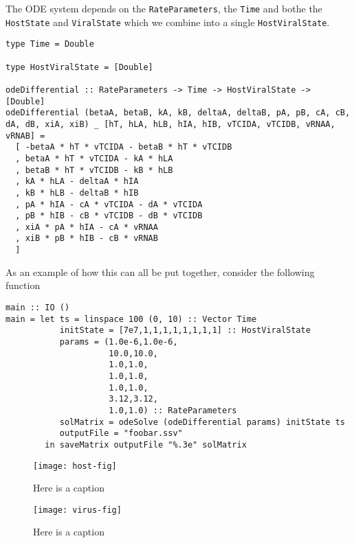 \documentclass{article}
\begin{document}
The ODE system depends on the \lstinline|RateParameters|, the \lstinline|Time|
and bothe the \lstinline|HostState| and \lstinline|ViralState| which we combine
into a single \lstinline|HostViralState|.

\begin{lstlisting}[caption={Give me a real caption}, label=differentialDefn]
type Time = Double

type HostViralState = [Double]

odeDifferential :: RateParameters -> Time -> HostViralState -> [Double]
odeDifferential (betaA, betaB, kA, kB, deltaA, deltaB, pA, pB, cA, cB, dA, dB, xiA, xiB) _ [hT, hLA, hLB, hIA, hIB, vTCIDA, vTCIDB, vRNAA, vRNAB] =
  [ -betaA * hT * vTCIDA - betaB * hT * vTCIDB
  , betaA * hT * vTCIDA - kA * hLA
  , betaB * hT * vTCIDB - kB * hLB
  , kA * hLA - deltaA * hIA
  , kB * hLB - deltaB * hIB
  , pA * hIA - cA * vTCIDA - dA * vTCIDA
  , pB * hIB - cB * vTCIDB - dB * vTCIDB
  , xiA * pA * hIA - cA * vRNAA
  , xiB * pB * hIB - cB * vRNAB
  ]
\end{lstlisting}

As an example of how this can all be put together, consider the following function

\begin{lstlisting}[caption={Give me a real caption}, label=mainFunc1]
main :: IO ()
main = let ts = linspace 100 (0, 10) :: Vector Time
           initState = [7e7,1,1,1,1,1,1,1,1] :: HostViralState
           params = (1.0e-6,1.0e-6,
                     10.0,10.0,
                     1.0,1.0,
                     1.0,1.0,
                     1.0,1.0,
                     3.12,3.12,
                     1.0,1.0) :: RateParameters
           solMatrix = odeSolve (odeDifferential params) initState ts
           outputFile = "foobar.ssv"
        in saveMatrix outputFile "%.3e" solMatrix
\end{lstlisting}

\begin{figure}
  \centering
  \texttt{[image: host-fig]}
  \caption{Here is a caption}
  \label{fig:host-fig}
\end{figure}

\begin{figure}
  \centering
  \texttt{[image: virus-fig]}
  \caption{Here is a caption}
  \label{fig:virus-fig}
\end{figure}
\end{document}
